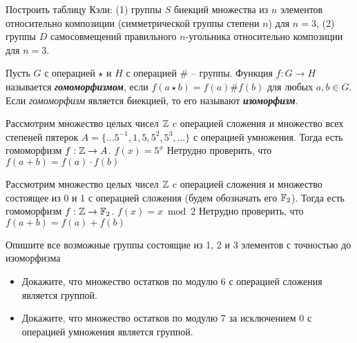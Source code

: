 \documentclass{article}
\begin{document}
    \begin{task_boxed}
        Построить таблицу Кэли:
        (1) группы $S$ биекций множества из $n$ элементов относительно композиции (симметрической группы степени $n$) для $n = 3$,
        (2) группы $D$ самосовмещений правильного $n$-угольника относительно композиции для $n = 3$.
    \end{task_boxed}

    \begin{definition_boxed}
        Пусть $G$ с операцией $\star$ и $H$ с операцией $\#$ – группы.
        Функция $f: G \to H$ называется \textbf{\textit{гомоморфизмом}}, если $f(a \star b) = f(a) \# f(b)$ для любых $a, b \in G$.\\
        Если \textit{гомоморфизм} является биекцией, то его называют \textbf{\textit{изоморфизм}}.
    \end{definition_boxed}

    \begin{example}
        Рассмотрим множество целых чисел $\mathbb{Z}$ c операцией сложения и множество всех степеней пятерок $A = \{\dotsc 5^{-1}, 1, 5, 5^{2}, 5^{3}, \dotsc\}$ с операцией умножения.
        Тогда есть гомоморфизм $f : \mathbb{Z} \rightarrow A$. $f(x) = 5^x$
        Нетрудно проверить, что $f(a + b) = f(a) \cdot f(b)$
    \end{example}

    \begin{example}
        Рассмотрим множество целых чисел $\mathbb{Z}$ c операцией сложения и множество состоящее из 0 и 1 с операцией сложения (будем обозначать его $\mathbb{F}_2$). Тогда есть гомоморфизм $f : \mathbb{Z} \rightarrow \mathbb{F}_2$. $f(x) = x \bmod 2$
        Нетрудно проверить, что $f(a + b) = f(a) + f(b)$
    \end{example}

    \begin{task_boxed}
        Опишите все возможные группы состоящие из 1, 2 и 3 элементов с точностью до изоморфизма
    \end{task_boxed}

    \begin{task_boxed}
        \begin{itemize}
            \item  Докажите, что множество остатков по модулю 6 с операцией сложения является группой.
            \item  Докажите, что множество остатков по модулю 7 за исключением 0 с операцией умножения является группой.
        \end{itemize}
    \end{task_boxed}
\end{document}
